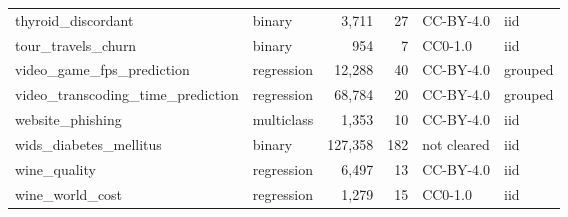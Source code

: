 \begin{longtable}{>{\raggedright\arraybackslash}p{5.5cm}lrrll}
thyroid\_\allowbreak{}discordant & binary & 3,711 & 27 & CC-BY-4.0 & iid\\
tour\_\allowbreak{}travels\_\allowbreak{}churn & binary & 954 & 7 & CC0-1.0 & iid\\
video\_\allowbreak{}game\_\allowbreak{}fps\_\allowbreak{}prediction & regression & 12,288 & 40 & CC-BY-4.0 & grouped\\
video\_\allowbreak{}transcoding\_\allowbreak{}time\_\allowbreak{}prediction & regression & 68,784 & 20 & CC-BY-4.0 & grouped\\
website\_\allowbreak{}phishing & multiclass & 1,353 & 10 & CC-BY-4.0 & iid\\
wids\_\allowbreak{}diabetes\_\allowbreak{}mellitus & binary & 127,358 & 182 & not cleared & iid\\
wine\_\allowbreak{}quality & regression & 6,497 & 13 & CC-BY-4.0 & iid\\
wine\_\allowbreak{}world\_\allowbreak{}cost & regression & 1,279 & 15 & CC0-1.0 & iid\\
\end{longtable}
\normalsize
